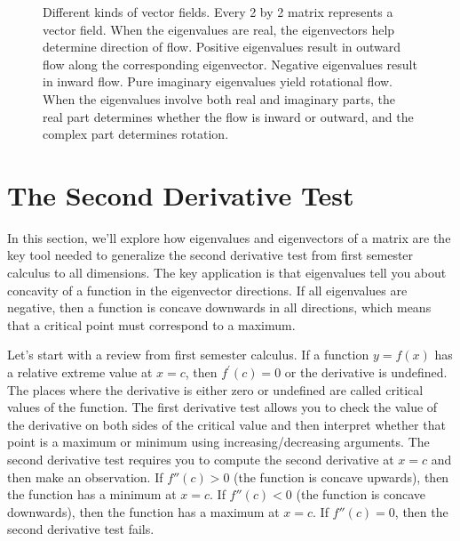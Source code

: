 \begin{figure}
\begin{tikzpicture}[inner sep=0mm]
\end{tikzpicture}
\caption{\label{vflots}
Different kinds of vector fields.  Every 2 by 2 matrix represents a vector field.  When the eigenvalues are real, the eigenvectors help determine direction of flow. Positive eigenvalues result in outward flow along the corresponding eigenvector. Negative eigenvalues result in inward flow. Pure imaginary eigenvalues yield rotational flow. When the eigenvalues involve both real and imaginary parts, the real part determines whether the flow is inward or outward, and the complex part determines rotation.
}
\end{figure}











\section{The Second Derivative Test}

In this section, we'll explore how eigenvalues and eigenvectors of a matrix are the key tool needed to generalize the second derivative test from first semester calculus to all dimensions. The key application is that eigenvalues tell you about concavity of a function in the eigenvector directions.  If all eigenvalues are negative, then a function is concave downwards in all directions, which means that a critical point must correspond to a maximum.    

Let's start with a review from first semester calculus. 
If a function $y=f(x)$ has a relative extreme value at $x=c$, then $f^\prime(c)=0$ or the derivative is undefined. 
The places where the derivative is either zero or undefined are called critical values of the function. 
The first derivative test allows you to check the value of the derivative on both sides of the critical value and then interpret whether that point is a maximum or minimum using increasing/decreasing arguments.  
The second derivative test requires you to compute the second derivative at $x=c$ and then make an observation. 
If $f''(c)>0$ (the function is concave upwards), then the function has a minimum at $x=c$. 
If $f''(c)<0$ (the function is concave downwards), then the function has a maximum at $x=c$. 
If $f''(c)=0$, then the second derivative test fails. 

